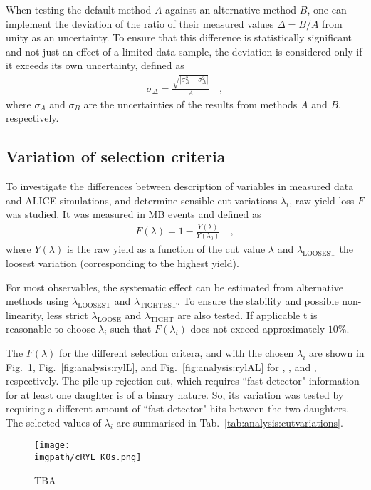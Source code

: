 When testing the default method $A$ against an alternative method $B$, one can implement the deviation of the ratio of their measured values $\Delta = B / A$ from unity as an uncertainty. To ensure that this difference is statistically significant and not just an effect of a limited data sample, the deviation is considered only if it exceeds its own uncertainty, defined as
\begin{align}
\sigma_\Delta = \frac{\sqrt{|\sigma_B^2 - \sigma_A^2|}}{A} \quad ,
\end{align}
where $\sigma_A$ and $\sigma_B$ are the uncertainties of the results from methods $A$ and $B$, respectively.

\subsection{Variation of selection criteria}

To investigate the differences between description of variables in measured data and ALICE simulations, and determine sensible cut variations $\lambda_i$, raw yield loss $F$ was studied. It was measured in MB events and defined as
\begin{align}
F(\lambda) = 1 - \frac{Y(\lambda)}{Y(\lambda_0)} \quad ,
\end{align}
where $Y(\lambda)$ is the raw yield as a function of the cut value $\lambda$ and $\lambda_\mathrm{LOOSEST}$ the loosest variation (corresponding to the highest yield). 

For most observables, the systematic effect can be estimated from alternative methods using $\lambda_\mathrm{LOOSEST}$ and $\lambda_\mathrm{TIGHTEST}$. To ensure the stability and possible non-linearity, less strict $\lambda_\mathrm{LOOSE}$ and $\lambda_\mathrm{TIGHT}$ are also tested. If applicable t is reasonable to choose $\lambda_i$ such that $F(\lambda_i)$ does not exceed approximately $10\%$.

The $F(\lambda)$ for the different selection critera, and with the chosen $\lambda_i$ are shown in Fig.~\ref{fig:analysis:rylK0s}, Fig.~\ref{fig:analysis:rylL}, and Fig.~\ref{fig:analysis:rylAL} for \KOs, \LA, and \AL, respectively. The pile-up rejection cut, which requires ``fast detector" information for at least one daughter is of a binary nature. So, its variation was tested by requiring a different amount of ``fast detector" hits between the two daughters. The selected values of $\lambda_i$ are summarised in Tab.~\ref{tab:analysis:cutvariations}.

\begin{figure}
\texttt{[image: \\imgpath/cRYL\_K0s.png]}
\caption{TBA}
\label{fig:analysis:rylK0s}
\end{figure}

